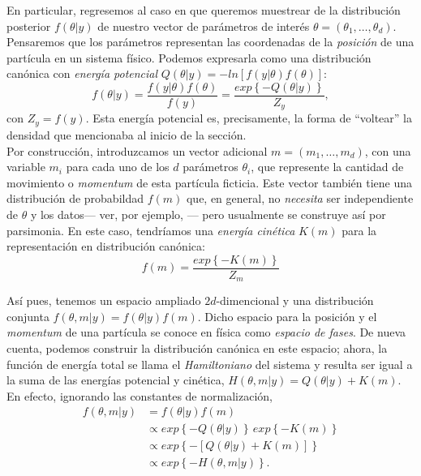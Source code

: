 En particular, regresemos al caso en que queremos muestrear de la distribución posterior $f(\theta|y)$ de nuestro vector de parámetros de interés $\theta = (\theta_1,\dots,\theta_d)$. Pensaremos que los parámetros representan las coordenadas de la \textit{posición} de una partícula en un sistema físico. Podemos expresarla como una distribución canónica con \textit{energía potencial} $Q(\theta|y) = -ln\left[f(y|\theta)f(\theta)\right]$: 
\begin{equation*}
 f(\theta|y)=\dfrac{f(y|\theta)f(\theta)}{f(y)}=\dfrac{exp\left\lbrace -Q(\theta|y)\right\rbrace}{Z_y},
\end{equation*} 
con $Z_y = f(y)$. Esta energía potencial es, precisamente, la forma de ``voltear'' la densidad que mencionaba al inicio de la sección.\\
 
 Por construcción, introduzcamos un vector adicional $m = (m_1,\dots,m_d)$, con una variable $m_i$ para cada uno de los $d$ parámetros $\theta_i$, que represente la cantidad de movimiento o \textit{momentum} de esta partícula ficticia. Este vector también tiene una distribución de probabildad $f(m)$ que, en general, no \textit{necesita} ser independiente de $\theta$ y los datos--- ver, por ejemplo, \textcite{Betancourt17}--- pero usualmente se construye así por parsimonia. En este caso, tendríamos una \textit{energía cinética} $K(m)$ para la representación en distribución canónica: 
 \begin{equation*}
f(m)=\dfrac{exp\left\lbrace -K(m)\right\rbrace}{Z_m}
 \end{equation*} 
 
 Así pues, tenemos un espacio ampliado $2d$-dimencional y una distribución conjunta $f(\theta,m|y)=f(\theta|y)f(m)$. Dicho espacio para la posición y el \textit{momentum} de una partícula se conoce en física como \textit{espacio de fases}. De nueva cuenta, podemos construir la distribución canónica en este espacio; ahora, la función de energía total se llama el \textit{Hamiltoniano} del sistema y resulta ser igual a la suma de las energías potencial y cinética, $H(\theta,m|y) = Q(\theta|y) + K(m)$. En efecto, ignorando las constantes de normalización, 
 \begin{align*}
 f(\theta,m|y)&=f(\theta|y)f(m)\\
 &\propto exp\left\lbrace -Q(\theta|y)\right\rbrace \, exp\left\lbrace -K(m)\right\rbrace\\
 &\propto exp\left\lbrace -\left[ Q(\theta|y) + K(m)\right]\right\rbrace\\
 &\propto exp\left\lbrace -H(\theta,m|y)\right\rbrace.
 \end{align*}
 
